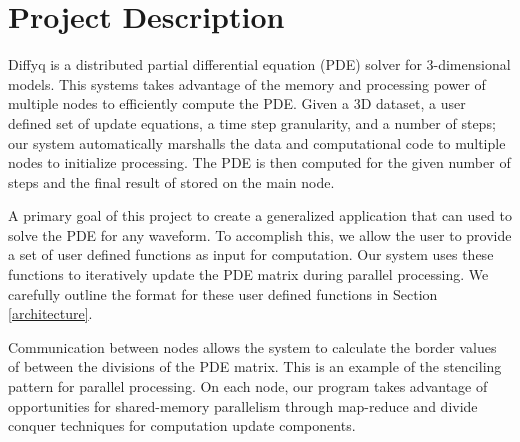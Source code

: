 \section{Project Description}
Diffyq is a distributed partial differential equation (PDE) solver for 3-dimensional models.  This systems takes advantage of the memory and processing power of multiple nodes to efficiently compute the PDE.  Given a 3D dataset, a user defined set of update equations, a time step granularity, and a number of steps; our system automatically marshalls the data and computational code to multiple nodes to initialize processing.  The PDE is then computed for the given number of steps and the final result of stored on the main node.

A primary goal of this project to create a generalized application that can used to solve the PDE for any waveform.  To accomplish this, we allow the user to provide a set of user defined functions as input for computation.  Our system uses these functions to iteratively update the PDE matrix during parallel processing.  We carefully outline the format for these user defined functions in Section \ref{architecture}.

Communication between nodes allows the system to calculate the border values of between the divisions of the PDE matrix.  This is an example of the stenciling pattern for parallel processing.  On each node, our program takes advantage of opportunities for shared-memory parallelism through map-reduce and divide conquer techniques for computation update components.